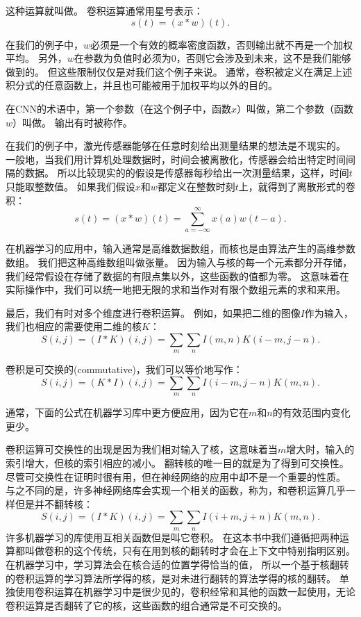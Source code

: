这种运算就叫做。
卷积运算通常用星号表示：
\begin{equation}
s(t) = (x*w)(t).
\end{equation}

在我们的例子中，$w$必须是一个有效的概率密度函数，否则输出就不再是一个加权平均。
另外，$w$在参数为负值时必须为0，否则它会涉及到未来，这不是我们能够做到的。
但这些限制仅仅是对我们这个例子来说。
通常，卷积被定义在满足上述积分式的任意函数上，并且也可能被用于加权平均以外的目的。

在\gls{CNN}的术语中，第一个参数（在这个例子中，函数$x$）叫做，第二个参数（函数$w$）叫做。
输出有时被称作。

 
在我们的例子中，激光传感器能够在任意时刻给出测量结果的想法是不现实的。
一般地，当我们用计算机处理数据时，时间会被离散化，传感器会给出特定时间间隔的数据。
所以比较现实的的假设是传感器每秒给出一次测量结果，这样，时间$t$只能取整数值。
如果我们假设$x$和$w$都定义在整数时刻$t$上，就得到了离散形式的卷积：
\begin{equation}
s(t) = (x*w)(t) = \sum_{a = -\infty}^{\infty} x(a)w(t-a).
\end{equation}

在机器学习的应用中，输入通常是高维数据数组，而核也是由算法产生的高维参数数组。
我们把这种高维数组叫做张量。
因为输入与核的每一个元素都分开存储，我们经常假设在存储了数据的有限点集以外，这些函数的值都为零。
这意味着在实际操作中，我们可以统一地把无限的求和当作对有限个数组元素的求和来用。

最后，我们有时对多个维度进行卷积运算。
例如，如果把二维的图像$I$作为输入，我们也相应的需要使用二维的核$K$：
\begin{equation}
S(i,j) = (I*K)(i,j) = \sum_m \sum_n I(m,n) K(i-m, j-n).
\end{equation}

卷积是可交换的(commutative)，我们可以等价地写作：
\begin{equation}
S(i, j) = (K*I)(i,j) = \sum_m \sum_n I(i-m, j-n) K(m, n).
\end{equation}

通常，下面的公式在机器学习库中更方便应用，因为它在$m$和$n$的有效范围内变化更少。%

 
卷积运算可交换性的出现是因为我们相对输入了核，这意味着当$m$增大时，输入的索引增大，但核的索引相应的减小。
翻转核的唯一目的就是为了得到可交换性。
尽管可交换性在证明时很有用，但在神经网络的应用中却不是一个重要的性质。
与之不同的是，许多神经网络库会实现一个相关的函数，称为，和卷积运算几乎一样但是并不翻转核：
\begin{equation}
S(i, j) = (I*K)(i, j) = \sum_m \sum_n I(i+m, j+n) K(m, n).
\end{equation}
许多机器学习的库使用互相关函数但是叫它卷积。
在这本书中我们遵循把两种运算都叫做卷积的这个传统，只有在用到核的翻转时才会在上下文中特别指明区别。
在机器学习中，学习算法会在核合适的位置学得恰当的值， 所以一个基于核翻转的卷积运算的学习算法所学得的核，是对未进行翻转的算法学得的核的翻转。
单独使用卷积运算在机器学习中是很少见的，卷积经常和其他的函数一起使用，无论卷积运算是否翻转了它的核，这些函数的组合通常是不可交换的。

